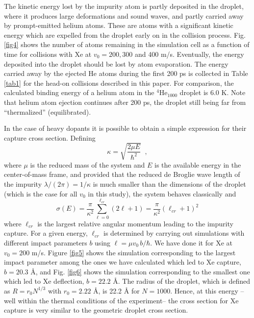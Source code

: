 The kinetic energy lost by the impurity atom is partly deposited 
in the droplet, where it produces large deformations and sound waves, 
and partly carried away by   prompt-emitted helium atoms. These are atoms  with a 
significant kinetic energy which are expelled from the droplet  
early on in the collision process. 
Fig. \ref{fig4}   shows the number of atoms remaining in the simulation cell as a function of time
for collisions with Xe at $v_0= 200, 300 $ and 400 m/s. 
Eventually, the energy deposited into the droplet should be lost by atom evaporation.
The energy carried away by the ejected He atoms during the first 200 ps is 
collected in Table \ref{tab1} for the head-on collisions described in this paper.
For comparison, the  calculated binding energy of  a helium atom in the $^4$He$_{1000}$ droplet is $6.0$ K.
Note that helium atom ejection continues after 200 ps, the droplet still being far from ``thermalized'' (equilibrated).

In the case of heavy dopants it is possible to obtain 
a simple expression for their capture cross 
section.  Defining
%
\begin{equation}
\kappa=\sqrt{\frac{2 \mu E}{\hbar^2}} \;\; ,
\label{eq9}
\end{equation}
%
where $\mu$ is the reduced mass of the system and
$E$ is the available energy in the center-of-mass frame, and 
provided that the reduced de Broglie wave length of the impurity
$\lambda/(2 \pi) = 1/\kappa$ is much smaller than the dimensions 
of the droplet (which is the case for all $v_0$  in this study), the system
behaves classically and \cite{Lea14a}
%
\begin{equation}
\sigma(E)= \frac{\pi}{\kappa^2 } \sum_{\ell=0}^{\ell_{cr}} (2 \ell
+1)= \frac{\pi}{\kappa^2 } (\ell_{cr} +1)^2  
\label{eq10}
\end{equation}
%
where $\ell_{cr}$ is the largest relative angular momentum leading to the impurity capture. 
For a given energy, $\ell_{cr}$ is determined by 
carrying out simulations with different impact parameters $b$ using  
$\ell= \mu v_0 \, b/\hbar$.
We have done it for Xe at $v_0= 200$ m/s. Figure \ref{fig5} shows the 
simulation corresponding to the largest impact parameter among the ones we have calculated
which led to Xe capture, $b=20.3$ \AA{}, and
Fig. \ref{fig6} shows the simulation corresponding to the smallest one
which led to Xe deflection, $b=22.2$ \AA{}.
The radius of the 
droplet, which is defined as $R= r_0 N^{1/3}$ 
with $r_0 = 2.22$ \AA{}, is 22.2 \AA{} for $N=1000$. 
Hence, at this energy --well within the thermal conditions of the experiment--
the cross section for Xe capture is very similar to the geometric droplet cross section. 

